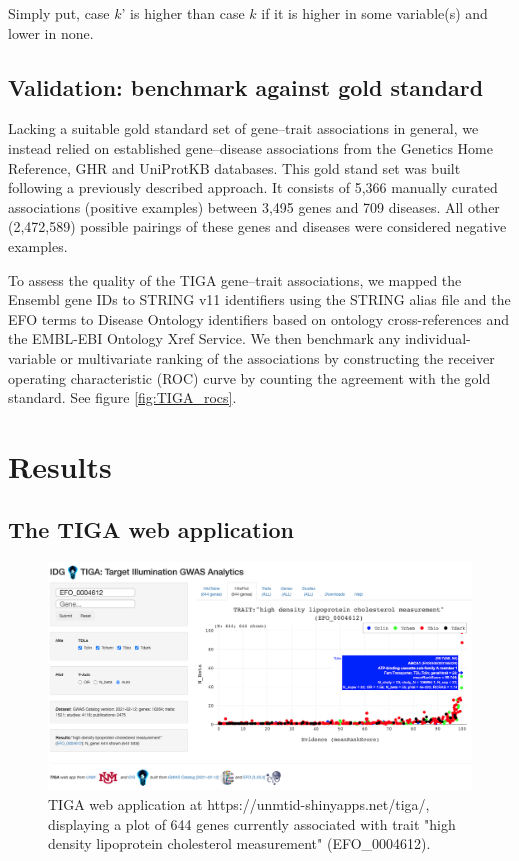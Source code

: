 Simply put, case $k$’ is higher than case $k$ if it is higher in some variable(s) and lower in none.

\subsection{Validation: benchmark against gold standard}

Lacking a suitable gold standard set of gene–trait associations in general, we instead relied on established gene–disease associations from the Genetics Home Reference, GHR\cite{Fomous2006-wm} and UniProtKB\cite{UniProt_Consortium2018-kq} databases. This gold stand set was built following a previously described approach\cite{Pletscher-Frankild2015-oo}. It consists of 5,366 manually curated associations (positive examples) between 3,495 genes and 709 diseases. All other (2,472,589) possible pairings of these genes and diseases were considered negative examples.

To assess the quality of the TIGA gene–trait associations, we mapped the Ensembl gene IDs to STRING v11 identifiers using the STRING alias file\cite{Szklarczyk2019-bc} and the EFO terms to Disease Ontology\cite{Schriml2019-uh} identifiers based on ontology cross-references and the EMBL-EBI Ontology Xref Service. We then benchmark any individual-variable or multivariate ranking of the associations by constructing the receiver operating characteristic (ROC) curve by counting the agreement with the gold standard. See figure \ref{fig:TIGA_rocs}.

\section{Results}

\subsection{The TIGA web application}

\begin{figure}
	\includegraphics[width=\textwidth]{figures/tiga/FIG03_TIGA_EFO_0004612_plot.png}
	\caption{TIGA web application at https://unmtid-shinyapps.net/tiga/, displaying a plot of 644 genes currently associated with trait "high density lipoprotein cholesterol measurement" (EFO\_0004612).}
	\label{fig:TIGA_app}
\end{figure}

